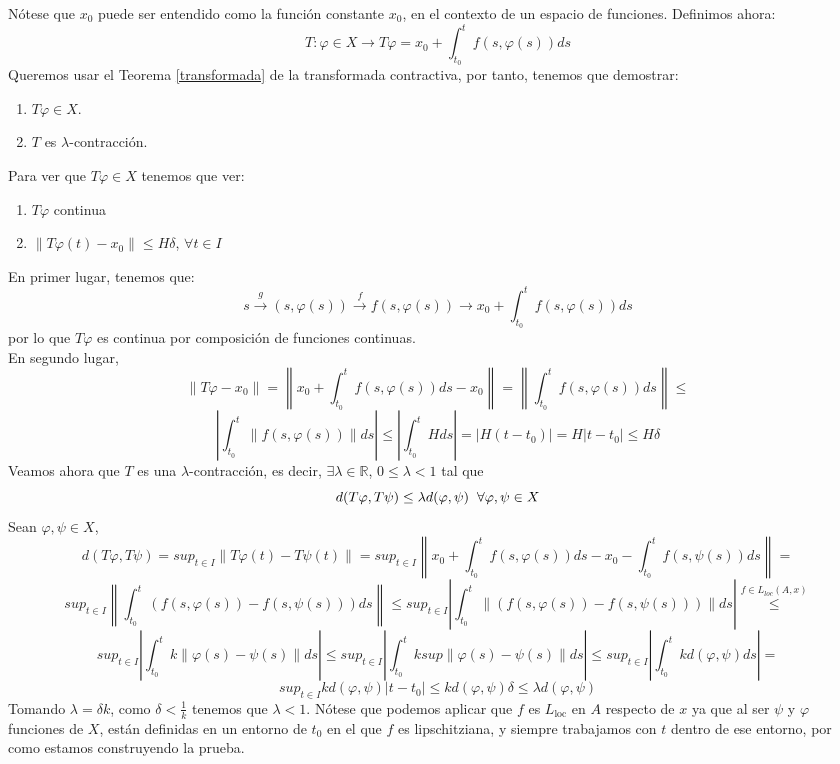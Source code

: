 \documentclass[11pt]{article}
\makeatletter
\theoremstyle{theorem-style}  %
\renewenvironment{proof}[1][\proofname]{\par
	\pushQED{\qed}%
	\normalfont \topsep6\p@\@plus6\p@\relax
	\list{}{%
		\settowidth{\leftmargin}{\quad:\hskip\labelsep}%
		\setlength{\labelwidth}{0pt}%
		\setlength{\itemindent}{-\leftmargin}%
	}%
	\item[\hskip\labelsep\itshape#1\@addpunct{:}]\ignorespaces
}{%
	\popQED\endlist\@endpefalse
}
\theoremstyle{definition-style}
\theoremstyle{example-style}
\providecommand{\norm}[1]{\left\lVert#1\right\rVert} %
\providecommand{\abs}[1]{\left\lvert#1\right\rvert} %
\makeatother
\begin{document}
\begin{proof}
	Nótese que $ x_0 $ puede ser entendido como la función constante $ x_0 $, en el contexto de un espacio de funciones. Definimos ahora:
	\[T:\varphi \in X \longrightarrow T\varphi = x_0 + \int_{t_0}^{t} f(s, \varphi(s))ds\]
	Queremos usar el Teorema \ref{transformada} de la transformada contractiva, por tanto, tenemos que demostrar:
	\begin{enumerate}
		\item $T\varphi \in X$.
		\item $T$ es $\lambda$-contracción.
	\end{enumerate}
	Para ver que $T\varphi \in X$ tenemos que ver:
	\begin{enumerate}[	i.]
		\item $T\varphi$ continua
		\item $\norm{T\varphi (t) - x_0} \leq H\delta$, $\forall t \in I$
	\end{enumerate}
	En primer lugar, tenemos que:
	\[s \stackrel{g}{\longrightarrow} (s, \varphi (s)) \stackrel{f}{\longrightarrow} f(s, \varphi (s)) \longrightarrow x_0 + \int_{t_0}^{t}f(s,\varphi (s))ds  \]
	por lo que $T\varphi$ es continua por composición de funciones continuas. \\
	En segundo lugar, 
	\[\norm{T\varphi - x_0} = \norm{x_0 + \int_{t_0}^{t} f(s, \varphi (s)) ds - x_0} = \norm{\int_{t_0}^{t} f(s, \varphi (s)) ds} \leq \]
	\[\abs{\int_{t_0}^{t} \norm{f(s, \varphi (s))}ds} \leq \abs{\int_{t_0}^{t} H ds} = \abs{H(t - t_0)} = H\abs{t - t_0} \leq H\delta \]
	Veamos ahora que $T$ es una $\lambda$-contracción, es decir, $\exists \lambda \in \mathbb{R}$, $0 \leq \lambda < 1$ tal que
	\[d(T\varphi, T\psi) \leq \lambda d(\varphi, \psi) \hspace{0,2cm} \forall \varphi, \psi \in X\]
	Sean $\varphi, \psi \in X$, \\
	\[d(T\varphi, T\psi) = sup_{t \in I} \norm{T\varphi (t) - T\psi (t)} = sup_{t \in I} \norm{x_0 + \int_{t_0}^{t} f(s, \varphi(s))ds - x_0 - \int_{t_0}^{t} f(s, \psi(s))ds} = \]
	\[sup_{t \in I} \norm{\int_{t_0}^{t} (f(s, \varphi(s)) - f(s, \psi(s)))ds} \leq sup_{t \in I} \abs{\int_{t_0}^{t} \norm{(f(s, \varphi(s)) - f(s, \psi(s)))}ds} \stackrel{f \in L_{loc} (A, x)}{\leq} \] 
	\[sup_{t \in I} \abs{\int_{t_0}^{t} k\norm{\varphi(s) - \psi(s)}ds} \leq sup_{t \in I} \abs{\int_{t_0}^{t} k sup\norm{\varphi(s) - \psi(s)}ds} \leq sup_{t \in I} \abs{\int_{t_0}^{t} k d(\varphi, \psi)ds} = \]
	\[sup_{t \in I} kd(\varphi, \psi)\abs{t - t_0} \leq kd(\varphi, \psi)\delta \leq \lambda d(\varphi, \psi)\]
	Tomando $\lambda = \delta k$, como $\delta < \frac{1}{k}$ tenemos que $\lambda < 1$. Nótese que podemos aplicar que $ f $ es $ L_{\text{loc}} $ en $ A $ respecto de $ x $ ya que al ser $ \psi $ y $ \varphi $ funciones de $ X $, están definidas en un entorno de $ t_0 $ en el que $ f $ es lipschitziana, y siempre trabajamos con $ t $ dentro de ese entorno, por como estamos construyendo la prueba.
	

\end{proof}
\end{document}
